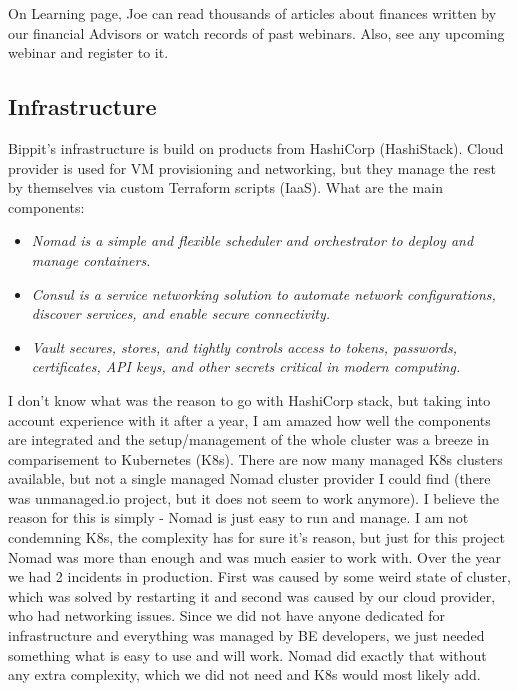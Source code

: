 \begin{example}[Education]
    On Learning page, Joe can read thousands of articles about finances written by our financial Advisors or watch records of past webinars. Also, see any upcoming webinar and register to it.
\end{example}



\subsection{Infrastructure}
Bippit's infrastructure is build on products from HashiCorp (HashiStack). Cloud provider is used for VM provisioning and networking, but they manage the rest by themselves via custom Terraform scripts (IaaS). What are the main components:
\begin{itemize}
    \item \it{Nomad}  is a simple and flexible scheduler and orchestrator to deploy and manage containers. \cite{NOMAD}
    \item \it{Consul} is a service networking solution to automate network configurations, discover services, and enable secure connectivity. \cite{CONSUL}
    \item \it{Vault} secures, stores, and tightly controls access to tokens, passwords, certificates, API keys, and other secrets critical in modern computing. \cite{VAULT}
\end{itemize}

I don't know what was the reason to go with HashiCorp stack, but taking into account experience with it after a year, I am amazed how well the components are integrated and the setup/management of the whole cluster was a breeze in comparisement to Kubernetes (K8s). There are now many managed K8s clusters available, but not a single managed Nomad cluster provider I could find (there was unmanaged.io project, but it does not seem to work anymore). I believe the reason for this is simply - Nomad is just easy to run and manage. I am not condemning K8s, the complexity has for sure it's reason, but just for this project Nomad was more than enough and was much easier to work with. Over the year we had 2 incidents in production. First was caused by some weird state of cluster, which was solved by restarting it and second was caused by our cloud provider, who had networking issues. Since we did not have anyone dedicated for infrastructure and everything was managed by BE developers, we just needed something what is easy to use and will work. Nomad did exactly that without any extra complexity, which we did not need and K8s would most likely add.


